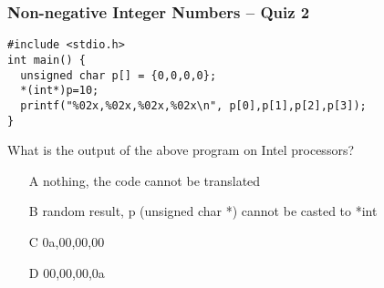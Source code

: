 \documentclass{beamer}
\begin{document}
\begin{frame}[fragile]
\frametitle{Non-negative Integer Numbers -- Quiz 2}
\begin{verbatim}
#include <stdio.h>
int main() {
  unsigned char p[] = {0,0,0,0};
  *(int*)p=10;
  printf("%02x,%02x,%02x,%02x\n", p[0],p[1],p[2],p[3]);
}
\end{verbatim}

What is the output of the above program on Intel processors?
\begin{itemize}
\item[A] nothing, the code cannot be translated
\item[B] random result, p (unsigned char *) cannot be casted to *int
\item[C] 0a,00,00,00 
\item[D] 00,00,00,0a
\end{itemize}
\end{frame}
\end{document}
